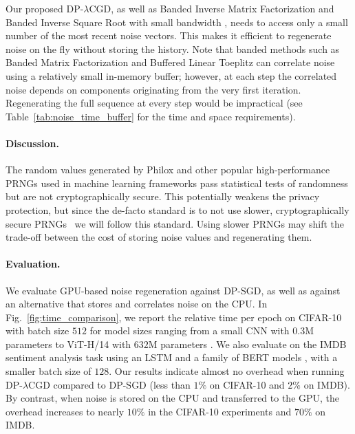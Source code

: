 \documentclass{article}
\theoremstyle{plain}
\theoremstyle{definition}
\theoremstyle{remark}
\newcommand{\method}{DP-$\lambda$CGD\xspace}
\begin{document}
Our proposed \method, as well as Banded Inverse Matrix Factorization and Banded Inverse Square Root with small bandwidth \citep{kalinin2025back}, needs to access only a small number of the most recent noise vectors. 
This makes it efficient to regenerate noise on the fly without storing the history. Note that banded methods such as Banded Matrix Factorization \citep{scalingmckenna2024} and Buffered Linear Toeplitz \citep{dvijotham2024efficient, hasslefree2024} can correlate noise using a relatively small in-memory buffer; however, at each step the correlated noise depends on components originating from the very first iteration. Regenerating the full sequence at every step would be impractical (see Table~\ref{tab:noise_time_buffer} for the time and space requirements).


\paragraph{Discussion.}
The random values generated by Philox and other popular high-performance PRNGs used in machine learning frameworks pass statistical tests of randomness but are not cryptographically secure. This potentially weakens the privacy protection, but since the de-facto standard is to not use slower, cryptographically secure PRNGs~\cite{egan2024highspeed} we will follow this standard.
Using slower PRNGs may shift the trade-off between the cost of storing noise values and regenerating them.

\paragraph{Evaluation.}
We evaluate GPU-based noise regeneration against DP-SGD, as well as against an alternative that stores and correlates noise on the CPU. In Fig.~\ref{fig:time_comparison}, we report the relative time per epoch on CIFAR-10 with batch size $512$ for model sizes ranging from a small CNN with $0.3$M parameters to ViT-H/14 with $632$M parameters \citep{dosovitskiy2021vit}. We also evaluate on the IMDB sentiment analysis task using an LSTM and a family of BERT models \citep{devlin2019bert}, with a smaller batch size of $128$. Our results indicate almost no overhead when running \method compared to DP-SGD (less than $1\%$ on CIFAR-10 and $2\%$ on IMDB). By contrast, when noise is stored on the CPU and transferred to the GPU, the overhead increases to nearly $10\%$ in the CIFAR-10 experiments and $70\%$ on IMDB.
\end{document}
